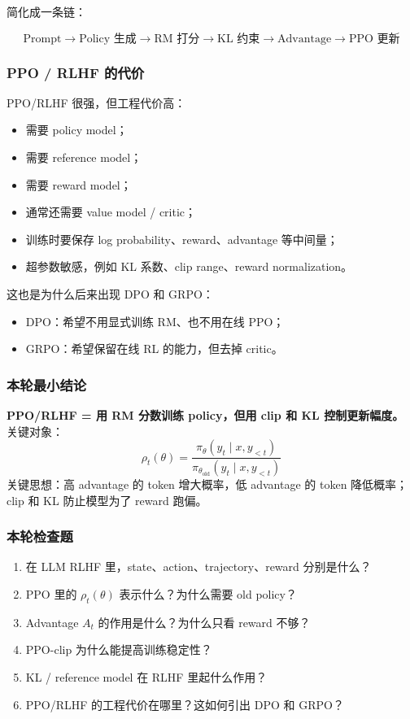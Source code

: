 简化成一条链：

\[
\text{Prompt}
\to
\text{Policy 生成}
\to
\text{RM 打分}
\to
\text{KL 约束}
\to
\text{Advantage}
\to
\text{PPO 更新}
\]

\subsubsection{PPO / RLHF 的代价}

PPO/RLHF 很强，但工程代价高：

\begin{itemize}[leftmargin=1.5em]
  \item 需要 policy model；
  \item 需要 reference model；
  \item 需要 reward model；
  \item 通常还需要 value model / critic；
  \item 训练时要保存 log probability、reward、advantage 等中间量；
  \item 超参数敏感，例如 KL 系数、clip range、reward normalization。
\end{itemize}

这也是为什么后来出现 DPO 和 GRPO：

\begin{itemize}[leftmargin=1.5em]
  \item DPO：希望不用显式训练 RM、也不用在线 PPO；
  \item GRPO：希望保留在线 RL 的能力，但去掉 critic。
\end{itemize}

\subsubsection{本轮最小结论}

\begin{summarybox}
\textbf{PPO/RLHF = 用 RM 分数训练 policy，但用 clip 和 KL 控制更新幅度。}\\
关键对象：
\[
\rho_t(\theta)
=
\frac{
\pi_\theta(y_t \mid x, y_{<t})
}{
\pi_{\theta_\text{old}}(y_t \mid x, y_{<t})
}
\]
关键思想：高 advantage 的 token 增大概率，低 advantage 的 token 降低概率；clip 和 KL 防止模型为了 reward 跑偏。
\end{summarybox}

\subsubsection{本轮检查题}

\begin{enumerate}[leftmargin=1.5em]
  \item 在 LLM RLHF 里，state、action、trajectory、reward 分别是什么？
  \item PPO 里的 $\rho_t(\theta)$ 表示什么？为什么需要 old policy？
  \item Advantage $A_t$ 的作用是什么？为什么只看 reward 不够？
  \item PPO-clip 为什么能提高训练稳定性？
  \item KL / reference model 在 RLHF 里起什么作用？
  \item PPO/RLHF 的工程代价在哪里？这如何引出 DPO 和 GRPO？
\end{enumerate}
